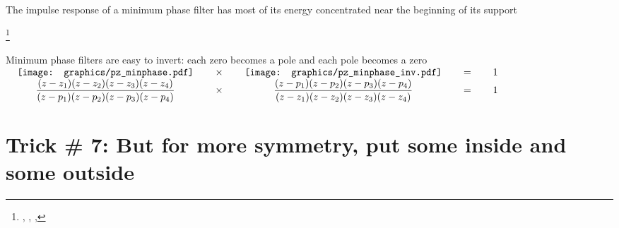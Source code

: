 \newpage\vfill
The impulse response of a minimum phase filter has most of its energy concentrated
near the beginning of its support

\footnote{
  ,
  ,  %
  ,  %
  }
\label{thm:ztr_redp}
\\
\vfill\mbox{}

\newpage\vfill
{\LARGE
Minimum phase filters are easy to invert: each zero becomes a pole and each pole becomes a zero
\vfill
$\begin{array}{ccccc}
     \tbox{\texttt{[image: graphics/pz\_minphase.pdf]}}
    &\tbox{$\times$}&
     \tbox{\texttt{[image: graphics/pz\_minphase\_inv.pdf]}}
    &\tbox{$=$}&
     \tbox{$1$}
  \\
  \ds\frac{\brp{z-z_1}\brp{z-z_2}\brp{z-z_3}\brp{z-z_4}}
          {\brp{z-p_1}\brp{z-p_2}\brp{z-p_3}\brp{z-p_4}}
  &\times&
  \ds\frac{\brp{z-p_1}\brp{z-p_2}\brp{z-p_3}\brp{z-p_4}}
          {\brp{z-z_1}\brp{z-z_2}\brp{z-z_3}\brp{z-z_4}}
    &=& 1
\end{array}$}
\vfill\mbox{}

\newpage
\section*{Trick \# 7: But for more symmetry, put some inside and some outside}


